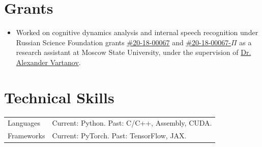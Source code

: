 \documentclass[10pt,letterpaper]{article}
\newcommand{\cvsection}[1]{\section*{#1}}
\newcommand{\compactitem}[1]{\item #1}
\begin{document}
\cvsection{Grants}
\begin{itemize}
  \compactitem{Worked on cognitive dynamics analysis and internal speech recognition under Russian Science Foundation grants \href{https://rscf.ru/project/LXjuaL8yl_MKyMwV-E0AYmYXKZ7dVATTIy5v_6WfDOq3PZJVv6H2gRUOxla_daUJ4bgTN-xp/}{\#20-18-00067} and \href{https://rscf.ru/project/OwNy03bhBYAiNgcRD1Lq9DYlzpziFaDtdi0LjD-lDfhmGp1fntBfNIA3DdjvFBf32QgMbnrg/}{\#20-18-00067-\(\Pi\)} as a research assistant at Moscow State University, under the supervision of \href{https://www.researchgate.net/profile/Vartanov-Alexander}{Dr. Alexander Vartanov}.}
\end{itemize}

\cvsection{Technical Skills}
\begin{tabularx}{\textwidth}{@{}p{1.18in}X@{}}
  Languages & Current: Python. Past: C/C++, Assembly, CUDA.\\
  Frameworks & Current: PyTorch. Past: TensorFlow, JAX.\\
\end{tabularx}
\end{document}
